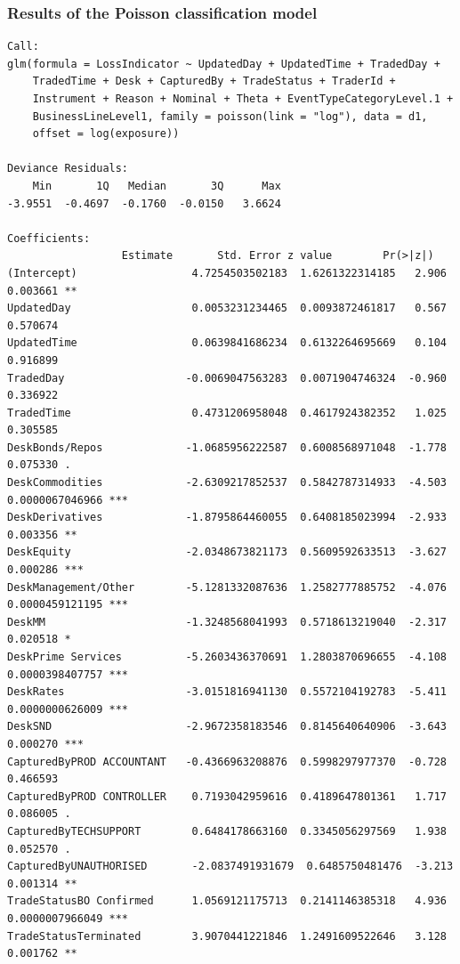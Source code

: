 \documentclass[a4paper]{article}
\begin{document}
\subsubsection{Results of the Poisson classification model}
\begin{verbatim}
Call:
glm(formula = LossIndicator ~ UpdatedDay + UpdatedTime + TradedDay + 
    TradedTime + Desk + CapturedBy + TradeStatus + TraderId + 
    Instrument + Reason + Nominal + Theta + EventTypeCategoryLevel.1 + 
    BusinessLineLevel1, family = poisson(link = "log"), data = d1, 
    offset = log(exposure))

Deviance Residuals: 
    Min       1Q   Median       3Q      Max  
-3.9551  -0.4697  -0.1760  -0.0150   3.6624  

Coefficients:
                  Estimate       Std. Error z value        Pr(>|z|)    
(Intercept)                  4.7254503502183  1.6261322314185   2.906        0.003661 ** 
UpdatedDay                   0.0053231234465  0.0093872461817   0.567        0.570674    
UpdatedTime                  0.0639841686234  0.6132264695669   0.104        0.916899    
TradedDay                   -0.0069047563283  0.0071904746324  -0.960        0.336922    
TradedTime                   0.4731206958048  0.4617924382352   1.025        0.305585    
DeskBonds/Repos             -1.0685956222587  0.6008568971048  -1.778        0.075330 .  
DeskCommodities             -2.6309217852537  0.5842787314933  -4.503 0.0000067046966 ***
DeskDerivatives             -1.8795864460055  0.6408185023994  -2.933        0.003356 ** 
DeskEquity                  -2.0348673821173  0.5609592633513  -3.627        0.000286 ***
DeskManagement/Other        -5.1281332087636  1.2582777885752  -4.076 0.0000459121195 ***
DeskMM                      -1.3248568041993  0.5718613219040  -2.317        0.020518 *  
DeskPrime Services          -5.2603436370691  1.2803870696655  -4.108 0.0000398407757 ***
DeskRates                   -3.0151816941130  0.5572104192783  -5.411 0.0000000626009 ***
DeskSND                     -2.9672358183546  0.8145640640906  -3.643        0.000270 ***
CapturedByPROD ACCOUNTANT   -0.4366963208876  0.5998297977370  -0.728        0.466593    
CapturedByPROD CONTROLLER    0.7193042959616  0.4189647801361   1.717        0.086005 .  
CapturedByTECHSUPPORT        0.6484178663160  0.3345056297569   1.938        0.052570 .  
CapturedByUNAUTHORISED       -2.0837491931679  0.6485750481476  -3.213        0.001314 ** 
TradeStatusBO Confirmed      1.0569121175713  0.2141146385318   4.936 0.0000007966049 ***
TradeStatusTerminated        3.9070441221846  1.2491609522646   3.128        0.001762 ** 

\end{verbatim}
\end{document}
